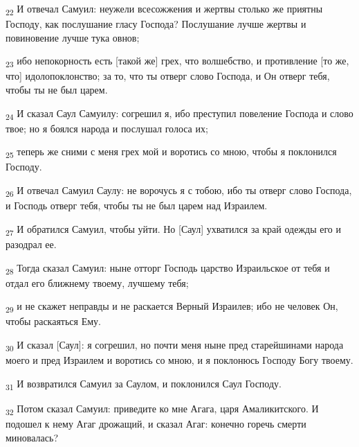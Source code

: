 \begin{tcolorbox}
\textsubscript{22} И отвечал Самуил: неужели всесожжения и жертвы столько же приятны Господу, как послушание гласу Господа? Послушание лучше жертвы и повиновение лучше тука овнов;
\end{tcolorbox}
\begin{tcolorbox}
\textsubscript{23} ибо непокорность есть [такой же] грех, что волшебство, и противление [то же, что] идолопоклонство; за то, что ты отверг слово Господа, и Он отверг тебя, чтобы ты не был царем.
\end{tcolorbox}
\begin{tcolorbox}
\textsubscript{24} И сказал Саул Самуилу: согрешил я, ибо преступил повеление Господа и слово твое; но я боялся народа и послушал голоса их;
\end{tcolorbox}
\begin{tcolorbox}
\textsubscript{25} теперь же сними с меня грех мой и воротись со мною, чтобы я поклонился Господу.
\end{tcolorbox}
\begin{tcolorbox}
\textsubscript{26} И отвечал Самуил Саулу: не ворочусь я с тобою, ибо ты отверг слово Господа, и Господь отверг тебя, чтобы ты не был царем над Израилем.
\end{tcolorbox}
\begin{tcolorbox}
\textsubscript{27} И обратился Самуил, чтобы уйти. Но [Саул] ухватился за край одежды его и разодрал ее.
\end{tcolorbox}
\begin{tcolorbox}
\textsubscript{28} Тогда сказал Самуил: ныне отторг Господь царство Израильское от тебя и отдал его ближнему твоему, лучшему тебя;
\end{tcolorbox}
\begin{tcolorbox}
\textsubscript{29} и не скажет неправды и не раскается Верный Израилев; ибо не человек Он, чтобы раскаяться Ему.
\end{tcolorbox}
\begin{tcolorbox}
\textsubscript{30} И сказал [Саул]: я согрешил, но почти меня ныне пред старейшинами народа моего и пред Израилем и воротись со мною, и я поклонюсь Господу Богу твоему.
\end{tcolorbox}
\begin{tcolorbox}
\textsubscript{31} И возвратился Самуил за Саулом, и поклонился Саул Господу.
\end{tcolorbox}
\begin{tcolorbox}
\textsubscript{32} Потом сказал Самуил: приведите ко мне Агага, царя Амаликитского. И подошел к нему Агаг дрожащий, и сказал Агаг: конечно горечь смерти миновалась?
\end{tcolorbox}
